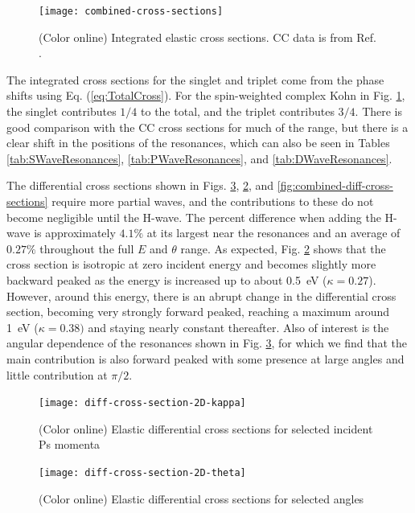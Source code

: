 \documentclass[preprint,showpacs,preprintnumbers,amsmath,amssymb,longbibliography,pra,aps]{revtex4-1}
\begin{document}
\begin{figure}[H]
	\centering
	\texttt{[image: combined-cross-sections]}
	\caption{(Color online) Integrated elastic cross sections. CC data is from Ref. \cite{Walters2004}.}
	\label{fig:combined-cross-sections}
\end{figure}

The integrated cross sections for the singlet and triplet come from the phase shifts using Eq. (\ref{eq:TotalCross}). For the spin-weighted complex Kohn in Fig. \ref{fig:combined-cross-sections}, the singlet contributes $1/4$ to the total, and the triplet contributes $3/4$. There is good comparison with the CC cross sections \cite{Walters2004} for much of the range, but there is a clear shift in the positions of the resonances, which can also be seen in Tables \ref{tab:SWaveResonances}, \ref{tab:PWaveResonances}, and \ref{tab:DWaveResonances}.

The differential cross sections shown in Figs. \ref{fig:diff-cross-section-2D-theta}, \ref{fig:diff-cross-section-2D-kappa}, and \ref{fig:combined-diff-cross-sections} require more partial waves, and the contributions to these do not become negligible until the H-wave. The percent difference when adding the H-wave is approximately $4.1\%$ at its largest near the resonances and an average of $0.27\%$ throughout the full $E$ and $\theta$ range. As expected, Fig. \ref{fig:diff-cross-section-2D-kappa} shows that the cross section is isotropic at zero incident energy and becomes slightly more backward peaked as the energy is increased up to about \mbox{0.5 eV} ($\kappa = 0.27$). However, around this energy, there is an abrupt change in the differential cross section, becoming very strongly forward peaked, reaching a maximum around \mbox{1 eV} ($\kappa = 0.38)$ and staying nearly constant thereafter. Also of interest is the angular dependence of the resonances shown in Fig. \ref{fig:diff-cross-section-2D-theta}, for which we find that the main contribution is also forward peaked with some presence at large angles and little contribution at $\pi/2$.

\begin{figure}[H]
	\centering
	\texttt{[image: diff-cross-section-2D-kappa]}
	\caption{(Color online) Elastic differential cross sections for selected incident Ps momenta}
	\label{fig:diff-cross-section-2D-kappa}
\end{figure}

\begin{figure}[H]
	\centering
	\texttt{[image: diff-cross-section-2D-theta]}
	\caption{(Color online) Elastic differential cross sections for selected angles}
	\label{fig:diff-cross-section-2D-theta}
\end{figure}
\end{document}
